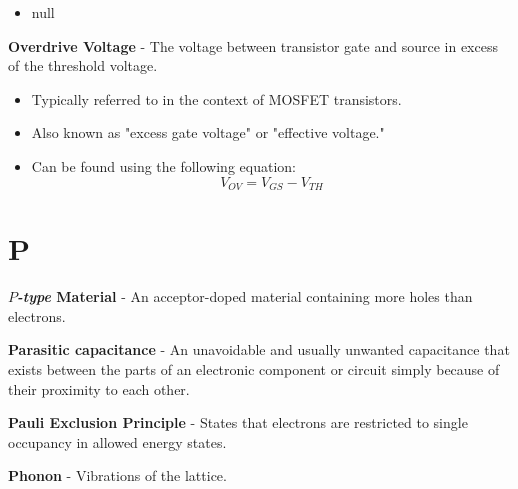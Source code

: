     \vspace{0.15cm}
    \begin{itemize}
        \setlength\itemsep{0.5em}
        \item{null}
    \end{itemize}
\vspace{0.5cm}
    \textbf{Overdrive Voltage} - The voltage between transistor gate and source in excess of the threshold voltage.
    \vspace{0.15cm}
    \begin{itemize}
        \setlength\itemsep{0.5em}
        \item{Typically referred to in the context of MOSFET transistors.}
        \item{Also known as "excess gate voltage" or "effective voltage."}
        \item{Can be found using the following equation:}
        \begin{equation}
            V_{OV} = V_{GS} - V_{TH}
        \end{equation}
    \end{itemize}
\section{P}
    \textbf{$P$\emph{-type} Material} - An acceptor-doped material containing more holes than electrons.

\vspace{0.5cm}
\noindent
    \textbf{Parasitic capacitance} - An unavoidable and usually unwanted capacitance that exists between the parts of an electronic component or circuit simply because of their proximity to each other.

\vspace{0.5cm}
\noindent
    \textbf{Pauli Exclusion Principle} - States that electrons are restricted to single occupancy in allowed energy states.

\vspace{0.5cm}
\noindent
    \textbf{Phonon} - Vibrations of the lattice.
    
